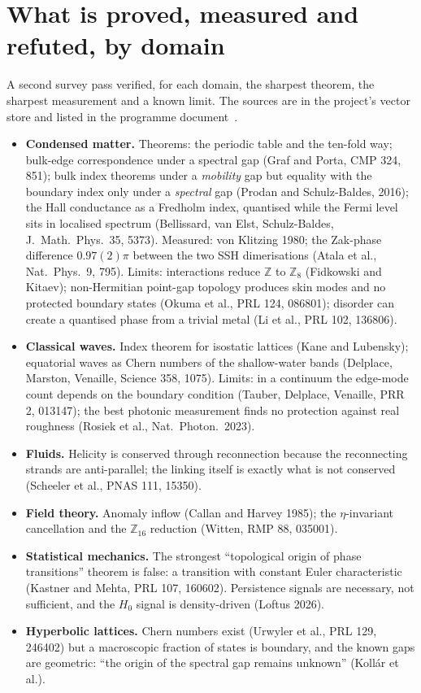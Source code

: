 \documentclass[11pt,a4paper]{article}
\begin{document}
\section{What is proved, measured and refuted, by domain}\label{sec:map}
A second survey pass verified, for each domain, the sharpest theorem, the sharpest measurement and a known limit. The sources are in the project's vector store and listed in the programme document~\cite{Programme}.
\begin{itemize}
\item \textbf{Condensed matter.} Theorems: the periodic table and the ten-fold way; bulk-edge correspondence under a spectral gap (Graf and Porta, CMP 324, 851); bulk index theorems under a \emph{mobility} gap but equality with the boundary index only under a \emph{spectral} gap (Prodan and Schulz-Baldes, 2016); the Hall conductance as a Fredholm index, quantised while the Fermi level sits in localised spectrum (Bellissard, van Elst, Schulz-Baldes, J.\ Math.\ Phys.\ 35, 5373). Measured: von Klitzing 1980; the Zak-phase difference $0.97(2)\pi$ between the two SSH dimerisations (Atala et al., Nat.\ Phys.\ 9, 795). Limits: interactions reduce $\mathbb Z$ to $\mathbb Z_8$ (Fidkowski and Kitaev); non-Hermitian point-gap topology produces skin modes and no protected boundary states (Okuma et al., PRL 124, 086801); disorder can create a quantised phase from a trivial metal (Li et al., PRL 102, 136806).
\item \textbf{Classical waves.} Index theorem for isostatic lattices (Kane and Lubensky); equatorial waves as Chern numbers of the shallow-water bands (Delplace, Marston, Venaille, Science 358, 1075). Limits: in a continuum the edge-mode count depends on the boundary condition (Tauber, Delplace, Venaille, PRR 2, 013147); the best photonic measurement finds no protection against real roughness (Rosiek et al., Nat.\ Photon.\ 2023).
\item \textbf{Fluids.} Helicity is conserved through reconnection because the reconnecting strands are anti-parallel; the linking itself is exactly what is not conserved (Scheeler et al., PNAS 111, 15350).
\item \textbf{Field theory.} Anomaly inflow (Callan and Harvey 1985); the $\eta$-invariant cancellation and the $\mathbb Z_{16}$ reduction (Witten, RMP 88, 035001).
\item \textbf{Statistical mechanics.} The strongest ``topological origin of phase transitions'' theorem is false: a transition with constant Euler characteristic (Kastner and Mehta, PRL 107, 160602). Persistence signals are necessary, not sufficient, and the $H_0$ signal is density-driven (Loftus 2026).
\item \textbf{Hyperbolic lattices.} Chern numbers exist (Urwyler et al., PRL 129, 246402) but a macroscopic fraction of states is boundary, and the known gaps are geometric: ``the origin of the spectral gap remains unknown'' (Kollár et al.).
\end{itemize}
\end{document}
